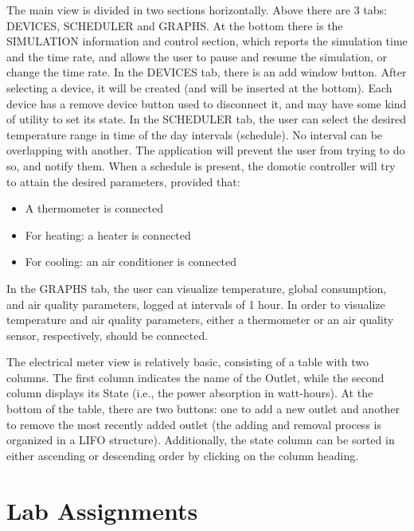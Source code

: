 \documentclass[a4paper,12pt]{report}
\begin{document}
The main view is divided in two sections horizontally. \newline
Above there are 3 tabs: DEVICES, SCHEDULER and GRAPHS. \newline
At the bottom there is the SIMULATION information and control section, which reports the simulation time and the time rate, and allows the user to pause and resume the simulation, or change the time rate. \newline
In the DEVICES tab, there is an add window button. After selecting a device,
it will be created (and will be inserted at the bottom). Each device has a remove device button
used to disconnect it, and may have some kind of utility to set its state. \newline
In the SCHEDULER tab, the user can select the desired temperature range in time of the day intervals (schedule). \newline
No interval can be overlapping with another. The application will prevent the user from trying to do so, and notify them. \newline
When a schedule is present, the domotic controller will try to attain the desired parameters, provided that:
\begin{itemize}
	\item A thermometer is connected
	\item For heating: a heater is connected
	\item For cooling: an air conditioner is connected
\end{itemize}
In the GRAPHS tab, the user can visualize temperature, global consumption, and air quality parameters, logged at intervals of 1 hour. \newline
In order to visualize temperature and air quality parameters, either a thermometer or an air quality sensor, respectively, should be connected.

The electrical meter view is relatively basic, consisting of a table with two columns. \newline
The first column indicates the name of the Outlet, while the second column displays its State (i.e., the power absorption in watt-hours). \newline
At the bottom of the table, there are two buttons: one to add a new outlet and another to remove the most recently added outlet 
(the adding and removal process is organized in a LIFO structure). \newline
Additionally, the state column can be sorted in either ascending or descending order by clicking on the column heading.

\chapter{Lab Assignments}






\end{document}
